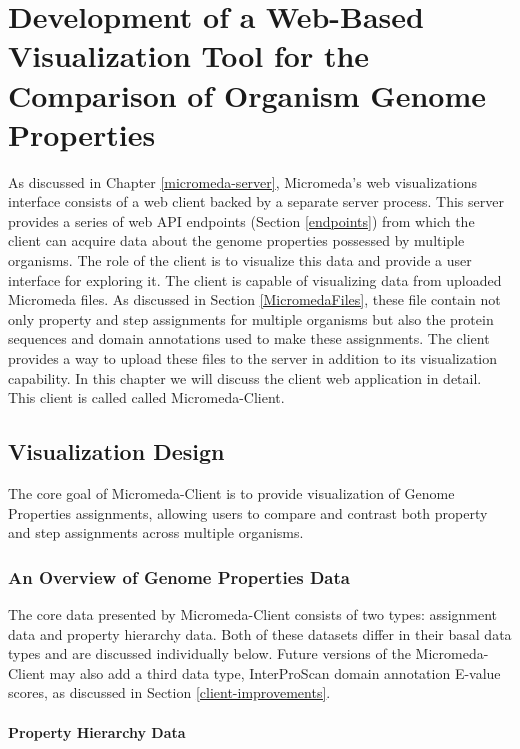 \chapter{Development of a Web-Based Visualization Tool for the Comparison of Organism Genome Properties} \label{micromeda-client}

As discussed in Chapter \ref{micromeda-server}, Micromeda's web visualizations interface consists of a web client backed by a separate server process. This server provides a series of web API endpoints (Section \ref{endpoints}) from which the client can acquire data about the genome properties possessed by multiple organisms. The role of the client is to visualize this data and provide a user interface for exploring it. The client is capable of visualizing data from uploaded Micromeda files. As discussed in Section \ref{MicromedaFiles}, these file contain not only property and step assignments for multiple organisms but also the protein sequences and domain annotations used to make these assignments. The client provides a way to upload these files to the server in addition to its visualization capability. In this chapter we will discuss the client web application in detail. This client is called called Micromeda-Client.

\section{Visualization Design}

The core goal of Micromeda-Client is to provide visualization of Genome Properties assignments, allowing users to compare and contrast both property and step assignments across multiple organisms.

\subsection{An Overview of Genome Properties Data}

The core data presented by Micromeda-Client consists of two types: assignment data and property hierarchy data. Both of these datasets differ in their basal data types and are discussed individually below. Future versions of the Micromeda-Client may also add a third data type, InterProScan domain annotation E-value scores, as discussed in Section \ref{client-improvements}.

\subsubsection{Property Hierarchy Data}

